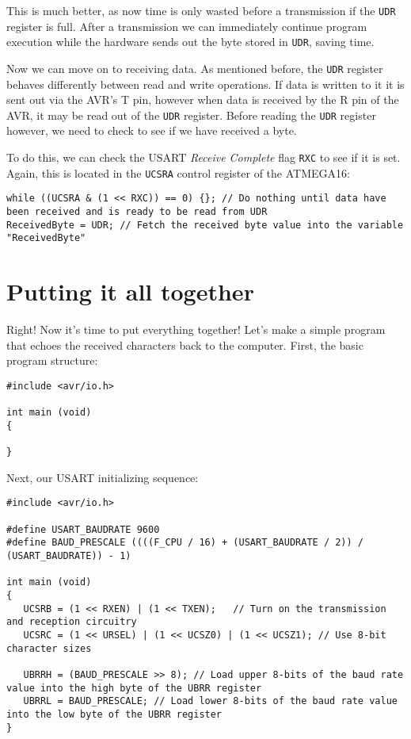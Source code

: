 \documentclass[a4paper,oneside,notitlepage]{book}
\begin{document}
This is much better, as now time is only wasted before a transmission if the \texttt{UDR} register is full. After a transmission we can immediately continue program execution while the hardware sends out the byte stored in \texttt{UDR}, saving time.


Now we can move on to receiving data. As mentioned before, the \texttt{UDR} register behaves differently between read and write operations. If data is written to it it is sent out via the AVR's T pin, however when data is received by the R pin of the AVR, it may be read out of the \texttt{UDR} register. Before reading the \texttt{UDR} register however, we need to check to see if we have received a byte.

To do this, we can check the USART \emph{Receive Complete} flag \texttt{RXC} to see if it is set. Again, this is located in the \texttt{UCSRA} control register of the ATMEGA16:

\begin{center}
\begin{lstlisting}
while ((UCSRA & (1 << RXC)) == 0) {}; // Do nothing until data have been received and is ready to be read from UDR
ReceivedByte = UDR; // Fetch the received byte value into the variable "ReceivedByte"
\end{lstlisting}
\end{center}

\chapter{Putting it all together}

Right! Now it's time to put everything together! Let's make a simple program that echoes the received characters back to the computer. First, the basic program structure:

\begin{center}
\begin{lstlisting}
#include <avr/io.h>

int main (void)
{

}
\end{lstlisting}
\end{center}

Next, our USART initializing sequence:

\begin{center}
\begin{lstlisting}
#include <avr/io.h>

#define USART_BAUDRATE 9600
#define BAUD_PRESCALE ((((F_CPU / 16) + (USART_BAUDRATE / 2)) / (USART_BAUDRATE)) - 1)

int main (void)
{
   UCSRB = (1 << RXEN) | (1 << TXEN);   // Turn on the transmission and reception circuitry
   UCSRC = (1 << URSEL) | (1 << UCSZ0) | (1 << UCSZ1); // Use 8-bit character sizes

   UBRRH = (BAUD_PRESCALE >> 8); // Load upper 8-bits of the baud rate value into the high byte of the UBRR register
   UBRRL = BAUD_PRESCALE; // Load lower 8-bits of the baud rate value into the low byte of the UBRR register
}
\end{lstlisting}
\end{center}
\end{document}
